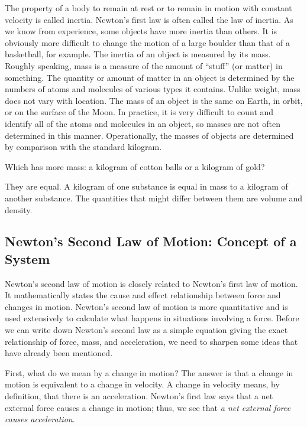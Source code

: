 \documentclass[../../main-ap-physics.tex]{subfiles}
\begin{document}
The property of a body to remain at rest or to remain in motion with constant velocity is called \gls{inertia}. Newton's first law is often called the \gls{law of inertia}. As we know from experience, some objects have more inertia than others. It is obviously more difficult to change the motion of a large boulder than that of a basketball, for example. The inertia of an object is measured by its mass. Roughly speaking, mass is a measure of the amount of ``stuff'' (or matter) in something. The quantity or amount of matter in an object is determined by the numbers of atoms and molecules of various types it contains. Unlike weight, mass does not vary with location. The mass of an object is the same on Earth, in orbit, or on the surface of the Moon. In practice, it is very difficult to count and identify all of the atoms and molecules in an object, so masses are not often determined in this manner. Operationally, the masses of objects are determined by comparison with the standard kilogram.

\begin{cfu}
    Which has more mass: a kilogram of cotton balls or a kilogram of gold?
\end{cfu}

\Solution They are equal. A kilogram of one substance is equal in mass to a kilogram of another substance. The quantities that might differ between them are volume and density.

\endsolution

\subsection{Newton's Second Law of Motion: Concept of a System}

\gls{Newton's second law of motion} is closely related to Newton's first law of motion. It mathematically states the cause and effect relationship between force and changes in motion. Newton's second law of motion is more quantitative and is used extensively to calculate what happens in situations involving a force. Before we can write down Newton's second law as a simple equation giving the exact relationship of force, mass, and acceleration, we need to sharpen some ideas that have already been mentioned.

\vspace{1em}

First, what do we mean by a change in motion? The answer is that a change in motion is equivalent to a change in velocity. A change in velocity means, by definition, that there is an \gls{acceleration}. Newton's first law says that a net external force causes a change in motion; thus, we see that \textit{a net external force causes acceleration}.
\end{document}
